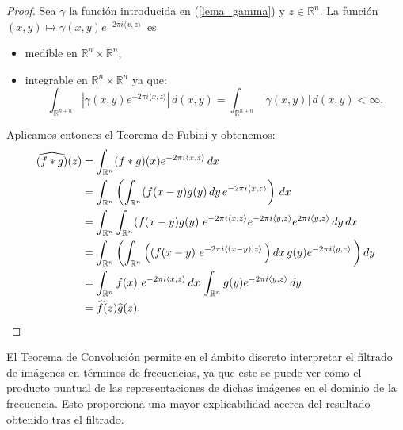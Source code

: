 \begin{proof}
Sea  $\gamma$ la función introducida en (\ref{lema_gamma}) y  $z \in \mathbb{R}^n$. La función $(x,y) \mapsto \gamma(x,y)e^{-2\pi i \langle x, z \rangle} \, $ es
\begin{itemize}[itemsep=0.5ex,parsep=0pt,topsep=0pt,partopsep=0pt]
    \item  medible en $\mathbb{R}^n \times \mathbb{R}^n$,
    \item integrable en $\mathbb{R}^n \times \mathbb{R}^n$ ya que:
    \begin{equation}
    \int_{\mathbb{R}^{n+n}}  |\gamma(x,y)e^{-2\pi i \langle x, z \rangle}| \, d(x,y) = \int_{\mathbb{R}^{n+n}}|\gamma(x,y)| \, d(x,y) < \infty.
    \end{equation}
\end{itemize}
 Aplicamos entonces el Teorema de Fubini y obtenemos:
\begin{equation*}
\begin{split}
\widehat{(f*g)}(z) &= \int_{\mathbb{R}^n}(f*g)(x)e^{-2\pi i \langle x, z \rangle} \, dx \\
&= \int_{\mathbb{R}^n}\left( \int_{\mathbb{R}^n}  (f(x-y)g(y) \, dy \,e^{-2\pi i \langle x, z \rangle} \right) \, dx \\
&= \int_{\mathbb{R}^n}\int_{\mathbb{R}^n}(f(x-y)g(y)\,  \, e^{-2\pi i \langle x, z \rangle} e^{-2\pi i \langle y, z \rangle}e^{2\pi i \langle y, z \rangle} \, dy  \, dx \\
&= \int_{\mathbb{R}^n}\left(\int_{\mathbb{R}^n}\left((f(x-y)\,  \, e^{-2\pi i \langle (x-y), z \rangle} \,\right) dx \, g(y)e^{-2\pi i \langle y, z \rangle} \,\right) dy  \\
&=  
\int_{\mathbb{R}^n}f(x)\,  \, e^{-2\pi i \langle x, z \rangle} \, dx \, \int_{\mathbb{R}^n}g(y)e^{-2\pi i \langle y, z \rangle} \, dy  \\
&=  
\widehat {f}(z)\widehat{g}(z).  \qedhere
\end{split} 
\end{equation*}
    
\end{proof}



\noindent El Teorema de Convolución permite en el ámbito discreto interpretar el filtrado de imágenes en términos de frecuencias, ya que este se puede ver como el producto puntual de las representaciones de dichas imágenes en el dominio de la frecuencia. Esto proporciona  una mayor explicabilidad acerca del resultado obtenido tras el filtrado. 

